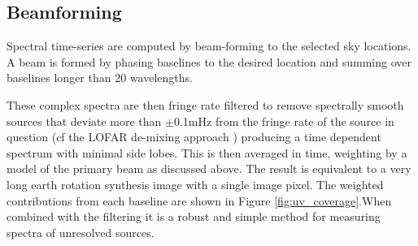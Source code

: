 \documentclass[preprint]{aastex}
\begin{document}

\subsection{Beamforming}

Spectral time-series are computed by beam-forming to the selected sky
locations. A beam is formed by phasing baselines to the desired location and
summing over baselines longer than 20 wavelengths.




 These complex spectra are then fringe rate filtered to remove spectrally
smooth sources that deviate more than $\pm$0.1mHz from the fringe rate of the source in question
 \citep{Parsons:2009p7859} (cf the LOFAR
de-mixing approach \cite{Offringa:2012p9691})  producing a time dependent
spectrum with minimal side lobes. This is then averaged in time,  weighting by a model of the primary
beam as discussed above.
The result is equivalent to
a very long earth rotation synthesis image with a single image pixel. The weighted
contributions from each baseline are shown in Figure \ref{fig:uv_coverage}.When
combined with the filtering it is a robust and simple method for measuring
spectra of unresolved sources. 

\end{document}
